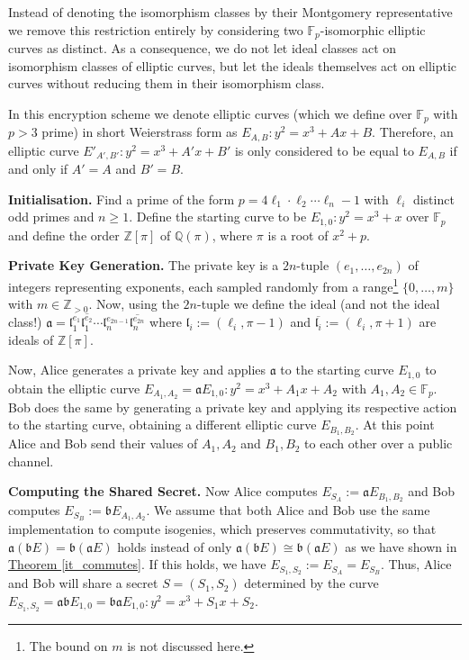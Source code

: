 \documentclass[openany, a4paper, 10pt]{book}
\theoremstyle{plain}
\theoremstyle{plain}
\theoremstyle{plain}
\theoremstyle{definition}
\theoremstyle{plain}
\theoremstyle{definition}
\theoremstyle{remark}
\newcommand{\theoref}[1]{\hyperref[#1]{Theorem \ref{#1}}}
\begin{document}
Instead of denoting the isomorphism classes by their Montgomery representative we remove this restriction entirely by considering two $\mathbb F_p$-isomorphic elliptic curves as distinct.
As a consequence, we do not let ideal classes act on isomorphism classes of elliptic curves, but let the ideals themselves act on elliptic curves without reducing them in their isomorphism class.

In this encryption scheme we denote elliptic curves (which we define over $\mathbb F_p$ with $p > 3$ prime) in short Weierstrass form as $E_{A, B}: y^2 = x^3 + Ax + B$.
Therefore, an elliptic curve $E'_{A', B'}: y^2 = x^3 + A'x + B'$ is only considered to be equal to $E_{A, B}$ if and only if $A' = A$ and $B' = B$.
\begin{cryptobox}[label={our_encryption}, nameref={our encryption scheme}]
    \textbf{Initialisation.} Find a prime of the form $p=4\ell_1 \cdot \ell_2 \cdots \ell_n - 1$ with $\ell_i$ distinct odd primes and $n \geq 1$.
    Define the starting curve to be $E_{1,0}: y^2 = x^3 + x$ over $\mathbb F_p$ and define the order $\mathbb Z[\pi]$ of $\mathbb Q(\pi)$, where $\pi$ is a root of $x^2+p$.

    \textbf{Private Key Generation.}
    The private key is a $2n$-tuple $(e_1, \dots, e_{2n})$ of integers representing exponents, each sampled randomly from a range\footnote[2]{The bound on $m$ is not discussed here.} $\{ 0, \dots, m \}$ with $m \in \mathbb Z_{>0}$.
    Now, using the $2n$-tuple we define the ideal (and not the ideal class!) $\mathfrak a = \mathfrak l_1^{e_1}\overline{\mathfrak l_1^{e_2}} \cdots \mathfrak l_{n}^{e_{2n-1}} \overline{\mathfrak l_n^{e_{2n}}}$ where $\mathfrak l_i:= (\ell_i, \pi-1)$ and $\overline{\mathfrak l_i} := (\ell_i, \pi+1)$ are ideals of $\mathbb Z[\pi]$.

    Now, Alice generates a private key and applies $\mathfrak a$ to the starting curve $E_{1,0}$ to obtain the elliptic curve
    $E_{A_1, A_2} = \mathfrak a E_{1,0}: y^2 = x^3 + A_1 x + A_2$ with $A_1, A_2 \in \mathbb F_p$.
    Bob does the same by generating a private key and applying its respective action to the starting curve, obtaining a different elliptic curve $E_{B_1,B_2}$.
    At this point Alice and Bob send their values of $A_1,A_2$ and $B_1,B_2$ to each other over a public channel.

    \textbf{Computing the Shared Secret.}
    Now Alice computes $E_{S_A} := \mathfrak aE_{B_1,B_2}$ and Bob computes $E_{S_B} := \mathfrak b E_{A_1,A_2}$.
    We assume that both Alice and Bob use the same implementation to compute isogenies, which preserves commutativity, so that $\mathfrak a(\mathfrak bE) = \mathfrak b(\mathfrak aE)$ holds instead of only $\mathfrak a(\mathfrak bE) \cong \mathfrak b(\mathfrak aE)$ as we have shown in \theoref{it_commutes}.
    If this holds, we have $E_{S_1, S_2} := E_{S_A} = E_{S_B}$.
    Thus, Alice and Bob will share a secret $S=(S_1, S_2)$ determined by the curve $E_{S_1, S_2} = \mathfrak a\mathfrak b E_{1,0} = \mathfrak b\mathfrak a E_{1,0}: y^2 = x^3 + S_1x + S_2$.
\end{cryptobox}
\end{document}
